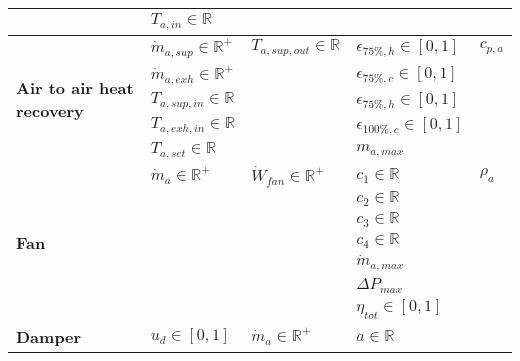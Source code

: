 \begin{table}[h!]
{\begin{tabular}{l|l|l|l|l}
                                          & $T_{a,in} \in \mathbb{R}$      &                  &                     &                    \\ \midrule
\multirow{5}{*}{\textbf{Air to air heat recovery}} &$\dot{m}_{a,sup} \in \mathbb{R}^+$&   $T_{a,sup,out} \in \mathbb{R}$& $\epsilon_{75\%,h} \in [0,1]$ &  $c_{p,a}$         \\
                                          &$\dot{m}_{a,exh} \in \mathbb{R}^+$&                  & $\epsilon_{75\%,c} \in [0,1]$ &                    \\
                                          &   $T_{a,sup,in} \in \mathbb{R}$&                  & $\epsilon_{75\%,h} \in [0,1]$ &                    \\
                                          &  $T_{a,exh,in} \in \mathbb{R}$ &                  & $\epsilon_{100\%,c} \in [0,1]$&                    \\
                                          &  $T_{a,set} \in \mathbb{R}$    &                  & $m_{a,max}$         &                    \\ \midrule
\multirow{7}{*}{\textbf{Fan}}                      &   $\dot{m}_a \in \mathbb{R}^+$   & $\dot{W}_{fan} \in \mathbb{R}^+$  & $c_1 \in \mathbb{R}$     &       $\rho_a$             \\
                                          &                 &                  & $c_2 \in \mathbb{R}$     &                    \\
                                          &                 &                  & $c_3 \in \mathbb{R}$     &                    \\
                                          &                 &                  & $c_4 \in \mathbb{R}$     &                    \\
                                          &                 &                  & $\dot{m}_{a,max}$   &                    \\
                                          &                 &                  & $\Delta P_{max}$    &                    \\
                                          &                 &                  & $\eta_{tot} \in [0,1]$&                    \\ \midrule
\multirow{3}{*}{\textbf{Damper}}                   & $u_d \in [0,1]$ &   $\dot{m}_a \in \mathbb{R}^+$    &       $a \in \mathbb{R}$           &                    \\

\end{tabular}}
\end{table}
